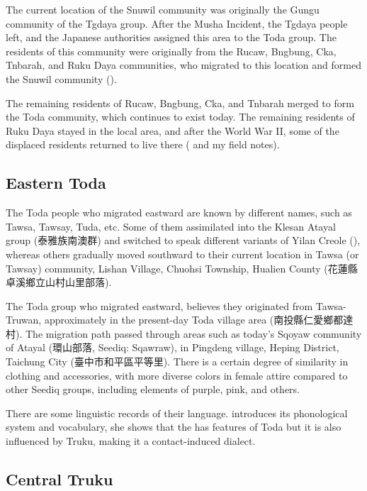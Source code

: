 The current location of the Snuwil community was originally the Gungu community of the Tgdaya group. After the Musha Incident, the Tgdaya people left, and the Japanese authorities assigned this area to the Toda group. The residents of this community were originally from the Rucaw, Bngbung, Cka, Tnbarah, and Ruku Daya communities, who migrated to this location and formed the Snuwil community (\cite{Yap2011, Yap_ongoing_gaoshan}).

The remaining residents of Rucaw, Bngbung, Cka, and Tnbarah merged to form the Toda community, which continues to exist today. The remaining residents of Ruku Daya stayed in the local area, and after the World War II, some of the displaced residents returned to live there (\cite{Yap2011} and my field notes).

\subsection{Eastern Toda}

The Toda people who migrated eastward are known by different names, such as Tawsa, Tawsay, Tuda, etc. Some of them assimilated into the Klesan Atayal group (泰雅族南澳群) and switched to speak different variants of Yilan Creole (\cite{liao1977Sedtheruy,chienandsanada2010Ch}), whereas others gradually moved southward to their current location in Tawsa (or Tawsay) community, Lishan Village, Chuohsi Township, Hualien County (花蓮縣卓溪鄉立山村山里部落). 

The Toda group who migrated eastward, believes they originated from Tawsa-Truwan, approximately in the present-day Toda village area (南投縣仁愛鄉都達村). The migration path passed through areas such as today's Sqoyaw community of Atayal (環山部落, Seediq: Sqawraw), in Pingdeng village, Heping District, Taichung City (臺中市和平區平等里). There is a certain degree of similarity in clothing and accessories, with more diverse colors in female attire compared to other Seediq groups, including elements of purple, pink, and others.

There are some linguistic records of their language. \textcite{lee2012tawsa} introduces its phonological system and vocabulary, she shows that the has features of Toda but it is also influenced by Truku, making it a contact-induced dialect. 

\subsection{Central Truku}

